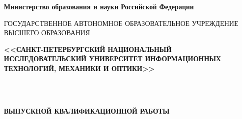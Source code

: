 \documentclass[10pt]{article}
\begin{document}
\begin{center}\textbf{Министерство образования и науки Российской Федерации}\end{center}

 ГОСУДАРСТВЕННОЕ АВТОНОМНОЕ ОБРАЗОВАТЕЛЬНОЕ УЧРЕЖДЕНИЕ ВЫСШЕГО ОБРАЗОВАНИЯ

\begin{center}\large\textbf{<<САНКТ-ПЕТЕРБУРГСКИЙ НАЦИОНАЛЬНЫЙ ИССЛЕДОВАТЕЛЬСКИЙ УНИВЕРСИТЕТ ИНФОРМАЦИОННЫХ ТЕХНОЛОГИЙ, МЕХАНИКИ И ОПТИКИ>>}\end{center}

~\\\begin{center}
\textbf{
~\\ВЫПУСКНОЙ КВАЛИФИКАЦИОННОЙ РАБОТЫ}
\end{center}
\end{document}
